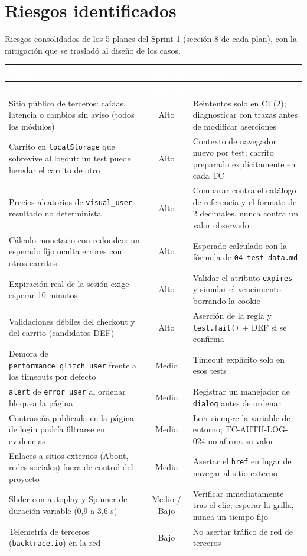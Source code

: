 \documentclass[10pt,a4paper]{article}
\newcommand{\tabhead}{\rowcolor{primary}}
\newcommand{\hcell}[1]{\textcolor{white}{\bfseries #1}}
\newcommand{\zebrarows}{\rowcolors{2}{zebra}{white}}
\begin{document}
\section{Riesgos identificados}
Riesgos consolidados de los 5 planes del Sprint 1 (sección 8 de cada plan), con la mitigación que se trasladó al diseño de los casos.

{\zebrarows
\begin{longtable}{|L{0.35\textwidth}|c|L{0.44\textwidth}|}
\hline
\tabhead \hcell{Riesgo} & \hcell{Impacto} & \hcell{Mitigación} \\ \hline
\endfirsthead
\hline
\tabhead \hcell{Riesgo} & \hcell{Impacto} & \hcell{Mitigación} \\ \hline
\endhead
Sitio público de terceros: caídas, latencia o cambios sin aviso (todos los módulos) & Alto & Reintentos solo en CI (2); diagnosticar con trazas antes de modificar aserciones \\ \hline
Carrito en \texttt{localStorage} que sobrevive al logout: un test puede heredar el carrito de otro & Alto & Contexto de navegador nuevo por test; carrito preparado explícitamente en cada TC \\ \hline
Precios aleatorios de \texttt{visual\_user}: resultado no determinista & Alto & Comparar contra el catálogo de referencia y el formato de 2 decimales, nunca contra un valor observado \\ \hline
Cálculo monetario con redondeo: un esperado fijo oculta errores con otros carritos & Alto & Esperado calculado con la fórmula de \texttt{04-test-data.md} \\ \hline
Expiración real de la sesión exige esperar 10 minutos & Alto & Validar el atributo \texttt{expires} y simular el vencimiento borrando la cookie \\ \hline
Validaciones débiles del checkout y del carrito (candidatos DEF) & Alto & Aserción de la regla y \texttt{test.fail()} + DEF si se confirma \\ \hline
Demora de \texttt{performance\_\allowbreak glitch\_\allowbreak user} frente a los timeouts por defecto & Medio & Timeout explícito solo en esos tests \\ \hline
\texttt{alert} de \texttt{error\_user} al ordenar bloquea la página & Medio & Registrar un manejador de \texttt{dialog} antes de ordenar \\ \hline
Contraseña publicada en la página de login podría filtrarse en evidencias & Medio & Leer siempre la variable de entorno; TC-AUTH-LOG-024 no afirma su valor \\ \hline
Enlaces a sitios externos (About, redes sociales) fuera de control del proyecto & Medio & Asertar el \texttt{href} en lugar de navegar al sitio externo \\ \hline
Slider con autoplay y Spinner de duración variable (0,9 a 3,6 s) & Medio / Bajo & Verificar inmediatamente tras el clic; esperar la grilla, nunca un tiempo fijo \\ \hline
Telemetría de terceros (\texttt{backtrace.io}) en la red & Bajo & No asertar tráfico de red de terceros \\ \hline
\end{longtable}}
\end{document}
